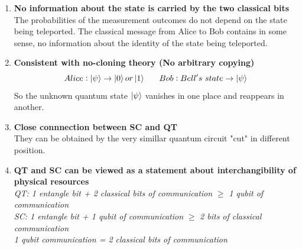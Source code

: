 \documentclass[]{book}
\theoremstyle{nonumberplain}
\begin{document}
\begin{enumerate}
		\item \textbf{No information about the state is carried by the two classical bits} \\
			The probabilities of the measurement outcomes do not depend on the state being teleported. The classical message from Alice to Bob contains in some sense, no information about the identity of the state being teleported.
		\item \textbf{Consistent with no-cloning theory (No arbitrary copying)}
\[
	Alice: \ket{\psi} \rightarrow \ket{0} or \ket{1} \ \ \ \ \ Bob:Bell's\ state \rightarrow \ket{\psi}			
\] 
So the unknown quantum state $\ket{\psi}$ vanishes in one place and reappears in another.
		\item  \textbf{Close connnection between SC and QT} \\
        They can be obtained by the very simillar quantum circuit "cut" in different position. 
		\item \textbf{QT and SC can be viewed as a statement about interchangibility of physical resources} \\
\textit{QT: 1 entangle bit + 2 classical bits of communication} $\geq$ \textit{1 qubit of communication} \\ 
\textit{SC: 1 entangle bit + 1 qubit of communication} $\geq$ \textit{2 bits of classical communication} \\ 
\textit{1 qubit communication  = 2 classical bits of communication}
\end{enumerate}
\ \\
\end{document}
